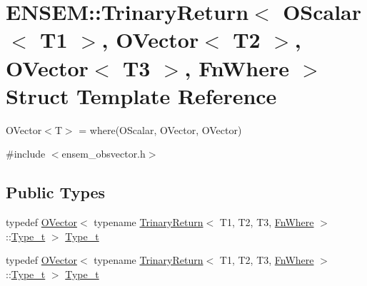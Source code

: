 \hypertarget{structENSEM_1_1TrinaryReturn_3_01OScalar_3_01T1_01_4_00_01OVector_3_01T2_01_4_00_01OVector_3_01T3_01_4_00_01FnWhere_01_4}{}\section{E\+N\+S\+EM\+:\+:Trinary\+Return$<$ O\+Scalar$<$ T1 $>$, O\+Vector$<$ T2 $>$, O\+Vector$<$ T3 $>$, Fn\+Where $>$ Struct Template Reference}
\label{structENSEM_1_1TrinaryReturn_3_01OScalar_3_01T1_01_4_00_01OVector_3_01T2_01_4_00_01OVector_3_01T3_01_4_00_01FnWhere_01_4}


O\+Vector$<$\+T$>$ = where(\+O\+Scalar, O\+Vector, O\+Vector)  




{\ttfamily \#include $<$ensem\+\_\+obsvector.\+h$>$}

\subsection*{Public Types}
\begin{DoxyCompactItemize}
\item 
typedef \mbox{\hyperlink{classENSEM_1_1OVector}{O\+Vector}}$<$ typename \mbox{\hyperlink{structENSEM_1_1TrinaryReturn}{Trinary\+Return}}$<$ T1, T2, T3, \mbox{\hyperlink{structENSEM_1_1FnWhere}{Fn\+Where}} $>$\+::\mbox{\hyperlink{structENSEM_1_1TrinaryReturn_3_01OScalar_3_01T1_01_4_00_01OVector_3_01T2_01_4_00_01OVector_3_01T3_01_4_00_01FnWhere_01_4_a27ce5df6798f4d75da92a7119c7f5987}{Type\+\_\+t}} $>$ \mbox{\hyperlink{structENSEM_1_1TrinaryReturn_3_01OScalar_3_01T1_01_4_00_01OVector_3_01T2_01_4_00_01OVector_3_01T3_01_4_00_01FnWhere_01_4_a27ce5df6798f4d75da92a7119c7f5987}{Type\+\_\+t}}
\item 
typedef \mbox{\hyperlink{classENSEM_1_1OVector}{O\+Vector}}$<$ typename \mbox{\hyperlink{structENSEM_1_1TrinaryReturn}{Trinary\+Return}}$<$ T1, T2, T3, \mbox{\hyperlink{structENSEM_1_1FnWhere}{Fn\+Where}} $>$\+::\mbox{\hyperlink{structENSEM_1_1TrinaryReturn_3_01OScalar_3_01T1_01_4_00_01OVector_3_01T2_01_4_00_01OVector_3_01T3_01_4_00_01FnWhere_01_4_a27ce5df6798f4d75da92a7119c7f5987}{Type\+\_\+t}} $>$ \mbox{\hyperlink{structENSEM_1_1TrinaryReturn_3_01OScalar_3_01T1_01_4_00_01OVector_3_01T2_01_4_00_01OVector_3_01T3_01_4_00_01FnWhere_01_4_a27ce5df6798f4d75da92a7119c7f5987}{Type\+\_\+t}}
\end{DoxyCompactItemize}


